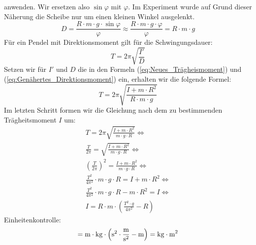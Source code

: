 \documentclass{article}
\begin{document}
				anwenden. Wir ersetzen also \( \sin \varphi \) mit \( \varphi \). Im Experiment wurde auf Grund dieser Näherung die Scheibe nur um einen kleinen Winkel ausgelenkt.
				\begin{equation}\label{eq:Genähertes_Direktionsmoment}
					D = \frac{ R \cdot m \cdot g \cdot \sin \varphi }{ \varphi } \approx \frac{ R \cdot m \cdot g \cdot \varphi }{ \varphi } = R \cdot m \cdot g
				\end{equation}
				Für ein Pendel mit Direktionsmoment gilt für die Schwingungsdauer:
				\begin{equation}
					T = 2 \pi \sqrt{ \frac{I'}{D} }
				\end{equation}
				Setzen wir für \(I'\) und \(D\) die in den Formeln (\ref{eq:Neues_Trägheismoment}) und (\ref{eq:Genähertes_Direktionsmoment}) ein, erhalten wir die folgende Formel:
				\begin{equation}
					T = 2 \pi \sqrt{ \frac{ I + m \cdot R^2 }{ R \cdot m \cdot g } }
				\end{equation}
				Im letzten Schritt formen wir die Gleichung nach dem zu bestimmenden Trägheitsmoment \(I\) um:
				\begin{equation}
					\begin{gathered} \label{eq:Trägheitsmoment_Schwingung}
						T = 2 \pi \sqrt{ \frac{ I + m \cdot R^2 }{ m \cdot g \cdot R } } \Leftrightarrow \\
						\frac{T}{ 2 \pi } = \sqrt{ \frac{ I + m \cdot R^2 }{ m \cdot g \cdot R } } \Leftrightarrow \\
						{\left( \frac{T}{ 2 \pi } \right)}^2 = \frac{ I + m \cdot R^2 }{ m \cdot g \cdot R } \Leftrightarrow \\
						\frac{T^2}{4 \pi^2} \cdot m \cdot g \cdot R = I + m \cdot R^2 \Leftrightarrow \\
						\frac{T^2}{4 \pi^2} \cdot m \cdot g \cdot R - m \cdot R^2 = I \Leftrightarrow \\
						I = R \cdot m \cdot \left( \frac{T^2 \cdot g }{ 4 \pi^2 } - R \right)
					\end{gathered}
				\end{equation}
				Einheitenkontrolle:
				\begin{equation}
					[I] = \unit{\metre} \cdot \unit{\kilogram} \cdot \left( \unit{\second^2} \cdot \unit{\frac{\metre}{\second^2}} - \unit{\metre} \right) = \unit{\kilogram \cdot \metre^2}
				\end{equation}
\end{document}
